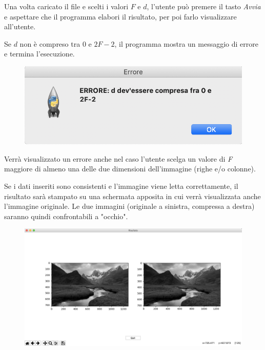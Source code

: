 \documentclass[preprint,12pt]{elsarticle}
\begin{document}
	Una volta caricato il file e scelti i valori $F$ e $d$, l'utente può premere il tasto \textit{Avvia} e aspettare che il programma elabori il risultato, per poi farlo visualizzare all'utente.
	
	Se $d$ non è compreso tra $0$ e $2F-2$, il programma mostra un messaggio di errore e termina l'esecuzione.
	\begin{figure}[H]
		\centering
		\includegraphics[width=0.55\linewidth]{errore}
	\end{figure}

	Verrà visualizzato un errore anche nel caso l'utente scelga un valore di \textit{F} maggiore di almeno una delle due dimensioni dell'immagine (righe e/o colonne).
	
	Se i dati inseriti sono consistenti e l'immagine viene letta correttamente, il risultato sarà stampato su una schermata apposita in cui verrà visualizzata anche l'immagine originale.
	Le due immagini (originale a sinistra, compressa a destra) saranno quindi confrontabili a "occhio".
		
		
		
		\begin{figure}[H]
			\centering
			\includegraphics[width=1\linewidth]{risultato}
		\end{figure}
		
\end{document}

